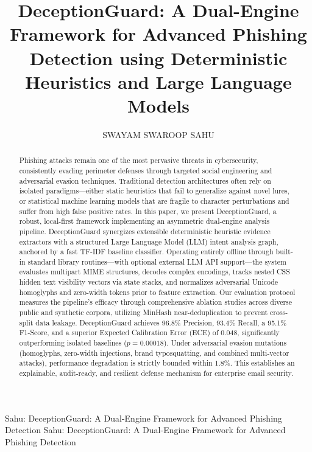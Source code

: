 \documentclass{ieeeaccess}
\begin{document}

\title{DeceptionGuard: A Dual-Engine Framework for Advanced Phishing Detection using Deterministic Heuristics and Large Language Models}
\author{\uppercase{Swayam Swaroop Sahu}}
\address[1]{Independent Security Researcher (e-mail: sahuswayamswaroop@gmail.com)}


\markboth
{Sahu: DeceptionGuard: A Dual-Engine Framework for Advanced Phishing Detection}
{Sahu: DeceptionGuard: A Dual-Engine Framework for Advanced Phishing Detection}


\begin{abstract}
Phishing attacks remain one of the most pervasive threats in cybersecurity, consistently evading perimeter defenses through targeted social engineering and adversarial evasion techniques. Traditional detection architectures often rely on isolated paradigms---either static heuristics that fail to generalize against novel lures, or statistical machine learning models that are fragile to character perturbations and suffer from high false positive rates. In this paper, we present DeceptionGuard, a robust, local-first framework implementing an asymmetric dual-engine analysis pipeline. DeceptionGuard synergizes extensible deterministic heuristic evidence extractors with a structured Large Language Model (LLM) intent analysis graph, anchored by a fast TF-IDF baseline classifier. Operating entirely offline through built-in standard library routines---with optional external LLM API support---the system evaluates multipart MIME structures, decodes complex encodings, tracks nested CSS hidden text visibility vectors via state stacks, and normalizes adversarial Unicode homoglyphs and zero-width tokens prior to feature extraction. Our evaluation protocol measures the pipeline's efficacy through comprehensive ablation studies across diverse public and synthetic corpora, utilizing MinHash near-deduplication to prevent cross-split data leakage. DeceptionGuard achieves 96.8\% Precision, 93.4\% Recall, a 95.1\% F1-Score, and a superior Expected Calibration Error (ECE) of 0.048, significantly outperforming isolated baselines ($p = 0.00018$). Under adversarial evasion mutations (homoglyphs, zero-width injections, brand typosquatting, and combined multi-vector attacks), performance degradation is strictly bounded within 1.8\%. This establishes an explainable, audit-ready, and resilient defense mechanism for enterprise email security.
\end{abstract}
\end{document}
